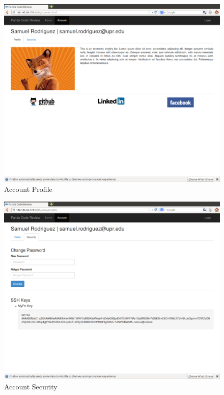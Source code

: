 
\begin{figure}[H]
	\centering
	\includegraphics[width=\textwidth]{img/account-profile}
	\caption{Account Profile}
\end{figure}

\begin{figure}[H]
	\centering
	\includegraphics[width=\textwidth]{img/account-secutiry}
	\caption{Account Security}
\end{figure}